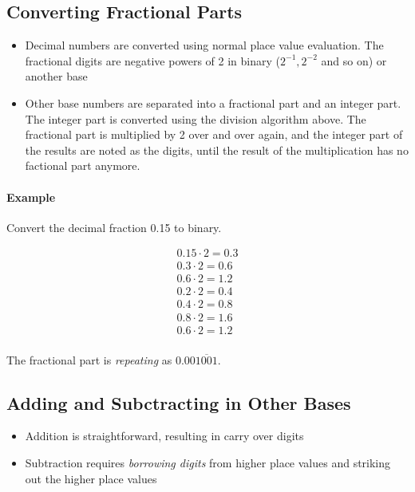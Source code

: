 \subsection{Converting Fractional Parts}
\begin{itemize}

	\item Decimal numbers are converted using normal place value evaluation. The fractional digits are negative powers of 2 in binary (\(2^{-1}, 2^{-2}\) and so on) or another base

	\item Other base numbers are separated into a fractional part and an integer part. The integer part is converted using the division algorithm above. The fractional part is multiplied by 2 over and over again, and the integer part of the results are noted as the digits, until the result of the multiplication has no factional part anymore.
\end{itemize}

\paragraph{Example}

Convert the decimal fraction 0.15 to binary.

\begin{align*}
	0.15 \cdot 2 = 0.3 \\
	0.3 \cdot 2 = 0.6  \\
	0.6 \cdot 2 = 1.2  \\
	0.2 \cdot 2 = 0.4  \\
	0.4 \cdot 2 = 0.8  \\
	0.8 \cdot 2 = 1.6  \\
	0.6 \cdot 2 = 1.2  \\
\end{align*}

The fractional part is \emph{repeating} as \(0.00\overline{1001}\).

\subsection{Adding and Subctracting in Other Bases}
\begin{itemize}
	\item Addition is straightforward, resulting in carry over digits
	\item Subtraction requires \emph{borrowing digits} from higher place values and striking out the higher place values
\end{itemize}

